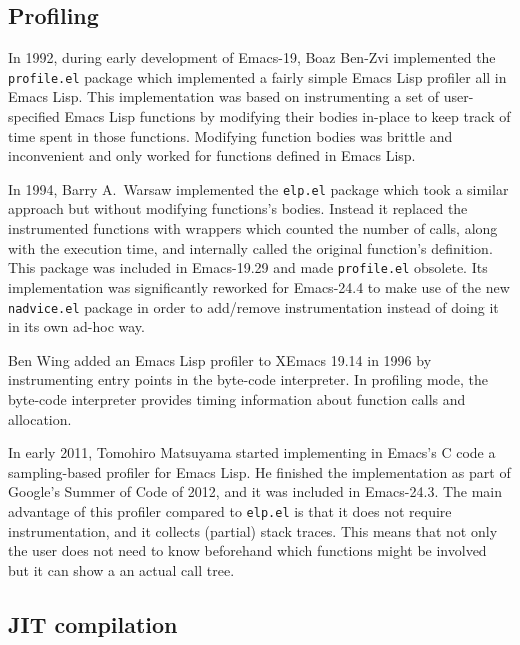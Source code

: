 \documentclass[format=acmsmall, review]{acmart}
\newcommand \Elisp {Emacs Lisp}
\begin{document}
\subsection{Profiling}
\label{sec:profiler}

In 1992, during early development of Emacs-19, Boaz Ben-Zvi implemented the
\texttt{profile.el} package which implemented a fairly simple \Elisp{}
profiler all in \Elisp{}.  This implementation was based on instrumenting
a set of user-specified \Elisp{} functions by modifying their bodies in-place
to keep track of time spent in those functions. Modifying function
bodies was brittle and inconvenient and only worked for functions
defined in \Elisp.

In 1994, Barry A.~Warsaw implemented the \texttt{elp.el} package which took
a similar approach but without modifying functions's bodies.
Instead it replaced the instrumented functions with wrappers which counted
the number of calls, along with the execution time, and internally called
the original function's definition.  This package was included in
Emacs-19.29 and made \texttt{profile.el} obsolete.  Its implementation was
significantly reworked for Emacs-24.4 to make use of the new
\texttt{nadvice.el} package in order to add/remove instrumentation instead
of doing it in its own ad-hoc way.

Ben Wing added an \Elisp{} profiler to XEmacs 19.14 in
1996 by instrumenting entry points in the byte-code interpreter.
In profiling mode, the byte-code interpreter provides timing
information about function calls and allocation.

In early 2011, Tomohiro Matsuyama started implementing in Emacs's C code
a sampling-based profiler for \Elisp{}.  He finished the implementation as
part of Google's Summer of Code of 2012, and it was included in Emacs-24.3.
The main advantage of this profiler compared to \texttt{elp.el} is that it
does not require instrumentation, and it collects (partial) stack traces.
This means that not only the user does not need to know beforehand which
functions might be involved but it can show a an actual call tree.

\subsection{JIT compilation}
\label{sec:jit}
\end{document}
